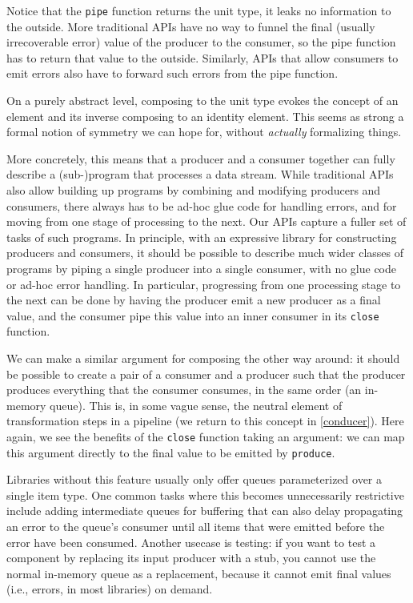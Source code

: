 \documentclass[sigplan,screen,10pt,anonymous,review]{acmart}
\begin{document}
Notice that the \texttt{pipe} function returns the unit type, it leaks no information to the outside. More traditional APIs have no way to funnel the final (usually irrecoverable error) value of the producer to the consumer, so the pipe function has to return that value to the outside. Similarly, APIs that allow consumers to emit errors also have to forward such errors from the pipe function.

On a purely abstract level, composing to the unit type evokes the concept of an element and its inverse composing to an identity element. This seems as strong a formal notion of symmetry we can hope for, without \textit{actually} formalizing things.

More concretely, this means that a producer and a consumer together can fully describe a (sub-)program that processes a data stream. While traditional APIs also allow building up programs by combining and modifying producers and consumers, there always has to be ad-hoc glue code for handling errors, and for moving from one stage of processing to the next. Our APIs capture a fuller set of tasks of such programs. In principle, with an expressive library for constructing producers and consumers, it should be possible to describe much wider classes of programs by piping a single producer into a single consumer, with no glue code or ad-hoc error handling. In particular, progressing from one processing stage to the next can be done by having the producer emit a new producer as a final value, and the consumer pipe this value into an inner consumer in its \texttt{close} function.

We can make a similar argument for composing the other way around: it should be possible to create a pair of a consumer and a producer such that the producer produces everything that the consumer consumes, in the same order (an in-memory queue). This is, in some vague sense, the neutral element of transformation steps in a pipeline (we return to this concept in \cref{conducer}). Here again, we see the benefits of the \texttt{close} function taking an argument: we can map this argument directly to the final value to be emitted by \texttt{produce}.

Libraries without this feature usually only offer queues parameterized over a single item type. One common tasks where this becomes unnecessarily restrictive include adding intermediate queues for buffering that can also delay propagating an error to the queue's consumer until all items that were emitted before the error have been consumed. Another usecase is testing: if you want to test a component by replacing its input producer with a stub, you cannot use the normal in-memory queue as a replacement, because it cannot emit final values (i.e., errors, in most libraries) on demand.
\end{document}

